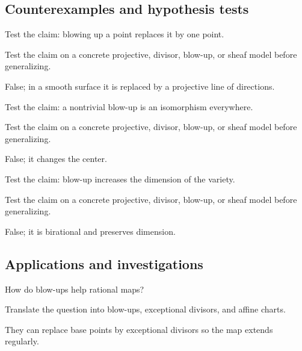 \subsection*{Counterexamples and hypothesis tests}

\begin{exercise}\label{exr:vi45-expand-10}
Test the claim: blowing up a point replaces it by one point.
\end{exercise}
\begin{hint}
Test the claim on a concrete projective, divisor, blow-up, or sheaf model before generalizing.
\end{hint}
\begin{solution}
False; in a smooth surface it is replaced by a projective line of directions.
\end{solution}

\begin{exercise}\label{exr:vi45-expand-11}
Test the claim: a nontrivial blow-up is an isomorphism everywhere.
\end{exercise}
\begin{hint}
Test the claim on a concrete projective, divisor, blow-up, or sheaf model before generalizing.
\end{hint}
\begin{solution}
False; it changes the center.
\end{solution}

\begin{exercise}\label{exr:vi45-expand-12}
Test the claim: blow-up increases the dimension of the variety.
\end{exercise}
\begin{hint}
Test the claim on a concrete projective, divisor, blow-up, or sheaf model before generalizing.
\end{hint}
\begin{solution}
False; it is birational and preserves dimension.
\end{solution}

\subsection*{Applications and investigations}

\begin{exercise}\label{exr:vi45-expand-13}
How do blow-ups help rational maps?
\end{exercise}
\begin{hint}
Translate the question into blow-ups, exceptional divisors, and affine charts.
\end{hint}
\begin{solution}
They can replace base points by exceptional divisors so the map extends regularly.
\end{solution}

